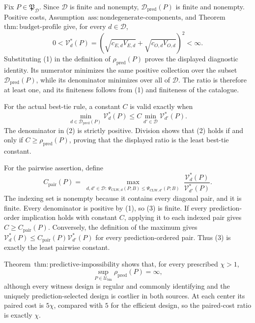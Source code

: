 Fix \(P\in\mathfrak P_{\mathcal D}\). Since \(\mathcal D\) is finite and nonempty, \(\mathcal D_{\mathrm{pred}}(P)\) is finite and nonempty. Positive costs, Assumption~\(\mathrm{ass{:}nondegenerate\text{-}components}\), and Theorem~\(\mathrm{thm{:}budget\text{-}profile}\) give, for every \(d\in\mathcal D\),
\[
 0<\mathcal V_d^*(P)
 =\left(\sqrt{c_{E,d}V_{E,d}}+
         \sqrt{c_{O,d}V_{O,d}}\right)^2<\infty.       \tag{1}
\]
Substituting (1) in the definition of \(\rho_{\mathrm{pred}}(P)\) proves the displayed diagnostic identity. Its numerator minimizes the same positive collection over the subset \(\mathcal D_{\mathrm{pred}}(P)\), while its denominator minimizes over all of \(\mathcal D\). The ratio is therefore at least one, and its finiteness follows from (1) and finiteness of the catalogue.

For the actual best-tie rule, a constant \(C\) is valid exactly when
\[
 \min_{d\in\mathcal D_{\mathrm{pred}}(P)}\mathcal V_d^*(P)
 \le C\min_{d'\in\mathcal D}\mathcal V_{d'}^*(P).    \tag{2}
\]
The denominator in (2) is strictly positive. Division shows that (2) holds if and only if \(C\ge\rho_{\mathrm{pred}}(P)\), proving that the displayed ratio is the least best-tie constant.

For the pairwise assertion, define
\[
 C_{\mathrm{pair}}(P)=
 \max_{\substack{d,d'\in\mathcal D:\,
 \Psi_{\mathrm{CLW},d}(P;B)
 \le\Psi_{\mathrm{CLW},d'}(P;B)}}
 \frac{\mathcal V_d^*(P)}{\mathcal V_{d'}^*(P)}.      \tag{3}
\]
The indexing set is nonempty because it contains every diagonal pair, and it is finite. Every denominator is positive by (1), so (3) is finite. If every prediction-order implication holds with constant \(C\), applying it to each indexed pair gives \(C\ge C_{\mathrm{pair}}(P)\). Conversely, the definition of the maximum gives \(\mathcal V_d^*(P)\le C_{\mathrm{pair}}(P)\mathcal V_{d'}^*(P)\) for every prediction-ordered pair. Thus (3) is exactly the least pairwise constant.

Theorem~\(\mathrm{thm{:}predictive\text{-}impossibility}\) shows that, for every prescribed \(\chi>1\),
\[
 \sup_{P\in\mathcal U_{\mathrm{bin}}}\rho_{\mathrm{pred}}(P)=\infty, \tag{4}
\]
although every witness design is regular and commonly identifying and the uniquely prediction-selected design is costlier in both sources. At each center its paired cost is \(5\chi\), compared with \(5\) for the efficient design, so the paired-cost ratio is exactly \(\chi\).

